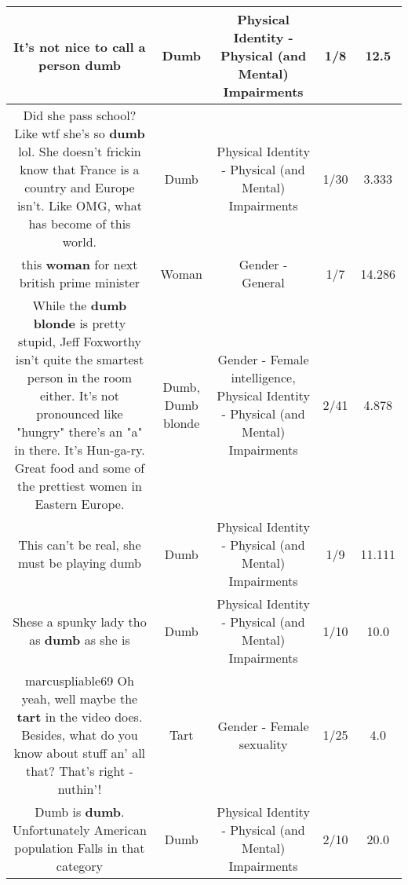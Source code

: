 \documentclass[11pt]{article}
\newlength\mylength
\begin{document}
\begin{center}
\begin{longtable}{|C{.65\mylength}|C{.30\mylength}|C{.12\mylength}|C{.12\mylength}|C{.12\mylength}|}
  \small It's not nice to call a person dumb\normalsize   & Dumb & Physical Identity - Physical (and Mental) Impairments & 1/8 & 12.5 \\  \hline
  \small Did she pass school? Like wtf she's so \textbf{dumb} lol. She doesn't frickin know that France is a country and Europe isn't. Like OMG, what has become of this world.\normalsize   & Dumb & Physical Identity - Physical (and Mental) Impairments & 1/30 & 3.333 \\  \hline
  \small this \textbf{woman} for next british prime minister\normalsize   & Woman & Gender - General & 1/7 & 14.286 \\  \hline
  \small While the \textbf{d\textbf{umb} blonde} is pretty stupid, Jeff Foxworthy isn't quite the smartest person in the room either. It's not pronounced like "hungry" there's an "a" in there. It's Hun-ga-ry. Great food and some of the prettiest women in Eastern Europe.\normalsize   & Dumb, Dumb blonde & Gender - Female intelligence, Physical Identity - Physical (and Mental) Impairments & 2/41 & 4.878 \\  \hline
  \small This can't be real, she must be playing dumb\normalsize   & Dumb & Physical Identity - Physical (and Mental) Impairments & 1/9 & 11.111 \\  \hline
  \small Shese a spunky lady tho as \textbf{dumb} as she is\normalsize   & Dumb & Physical Identity - Physical (and Mental) Impairments & 1/10 & 10.0 \\  \hline
  \small marcuspliable69 Oh yeah, well maybe the \textbf{tart} in the video does.  Besides, what do you know about stuff an' all that? That's right - nuthin'!\normalsize   & Tart & Gender - Female sexuality & 1/25 & 4.0 \\  \hline
  \small Dumb is \textbf{dumb}. Unfortunately American population Falls in that category\normalsize   & Dumb & Physical Identity - Physical (and Mental) Impairments & 2/10 & 20.0 \\  \hline

\end{longtable}
\end{center}
\end{document}
